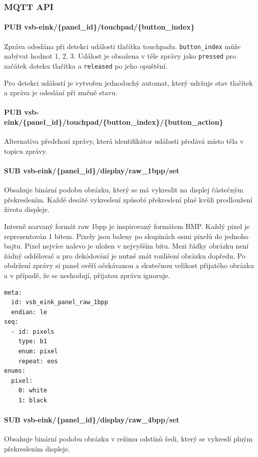 \subsubsection{MQTT API}
\paragraph*{PUB vsb-eink/\{panel\_id\}/touchpad/\{button\_index\}}
Zpráva odeslána při detekci události tlačítka touchpadu. \lstinline{button_index} může nabývat hodnot 1, 2, 3. Událost je obsažena v těle zprávy jako \verb|pressed| pro začátek doteku tlačítka a \verb|released| po jeho opuštění.

Pro detekci událostí je vytvořen jednoduchý automat, který udržuje stav tlačítek a zpráva je odeslání při změně stavu.

\paragraph*{PUB vsb-eink/\{panel\_id\}/touchpad/\{button\_index\}/\{button\_action\}}
Alternativa předchozí zprávy, která identifikátor události předává místo těla v topicu zprávy.

\paragraph*{SUB vsb-eink/\{panel\_id\}/display/raw\_1bpp/set}
Obsahuje binární podobu obrázku, který se má vykreslit na displej částečným překreslením. Každé desáté vykreslení způsobí překreslení plné kvůli prodloužení života displeje.

Interně nazvaný formát raw 1bpp je inspirovaný formátem BMP. Každý pixel je reprezentován 1 bitem. Pixely jsou baleny po skupinách osmi pixelů do jednoho bajtu. Pixel nejvíce nalevo je uložen v nejvyšším bitu. Mezi řádky obrázku není žádný oddělovač a pro dekódování je nutné znát rozlišení obrázku dopředu. Po obdržení zprávy si panel ověří očekávanou a skutečnou velikost přijatého obrázku a v případě, že se neshodují, přijatou zprávu ignoruje.

\begin{lstlisting}[label=src:kaitai-1bpp,caption={Kaitai schéma formátu raw 1bpp}]
meta:
  id: vsb_eink_panel_raw_1bpp
  endian: le
seq:
  - id: pixels
    type: b1
    enum: pixel
    repeat: eos
enums:
  pixel:
    0: white
    1: black
\end{lstlisting}

\paragraph*{SUB vsb-eink/\{panel\_id\}/display/raw\_4bpp/set}
Obsahuje binární podobu obrázku v režimu odstínů šedi, který se vykreslí plným překreslením displeje.

